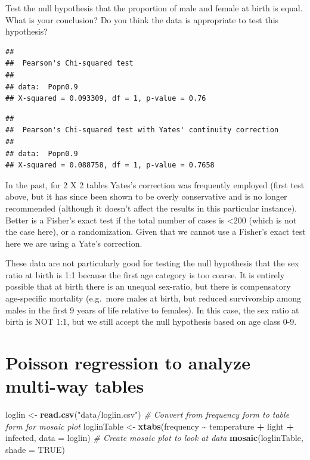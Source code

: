 \documentclass[
  12pt,
]{book}
\makeatletter
\newenvironment{Shaded}{\begin{snugshade}}{\end{snugshade}}
\newcommand{\CommentTok}[1]{\textcolor[rgb]{0.56,0.35,0.01}{\textit{#1}}}
\newcommand{\DataTypeTok}[1]{\textcolor[rgb]{0.13,0.29,0.53}{#1}}
\newcommand{\KeywordTok}[1]{\textcolor[rgb]{0.13,0.29,0.53}{\textbf{#1}}}
\newcommand{\NormalTok}[1]{#1}
\newcommand{\OperatorTok}[1]{\textcolor[rgb]{0.81,0.36,0.00}{\textbf{#1}}}
\newcommand{\OtherTok}[1]{\textcolor[rgb]{0.56,0.35,0.01}{#1}}
\newcommand{\StringTok}[1]{\textcolor[rgb]{0.31,0.60,0.02}{#1}}
\newenvironment{kframe}{%
\medskip{}
\setlength{\fboxsep}{.8em}
\def\at@end@of@kframe{}%
\ifinner\ifhmode%
 \def\at@end@of@kframe{\end{minipage}}%
 \begin{minipage}{\columnwidth}%
\fi\fi%
\def\FrameCommand##1{\hskip\@totalleftmargin \hskip-\fboxsep
\colorbox{incolor}{##1}\hskip-\fboxsep
    \hskip-\linewidth \hskip-\@totalleftmargin \hskip\columnwidth}%
\MakeFramed {\advance\hsize-\width
  \@totalleftmargin\z@ \linewidth\hsize
  \@setminipage}}%
{\par\unskip\endMakeFramed%
\at@end@of@kframe}
\newenvironment{rmdblock}[1]
 {
 \begin{itemize}
 \renewcommand{\labelitemi}{
   \raisebox{-.7\height}[0pt][0pt]{
     {\setkeys{Gin}{width=3em,keepaspectratio}\texttt{[image: images/\#1]}}
   }
 }
 \begin{kframe}
 \setlength{\fboxsep}{1em}
 \item
 }
 {
 \end{kframe}
 \end{itemize}
 }
\newenvironment{rmdcode}
  {\begin{rmdblock}{screen}}
  {\end{rmdblock}}
\makeatother
\begin{document}
\begin{rmdcode}
Test the null hypothesis that the proportion of male and female at birth is equal. What is your conclusion? Do you think the data is appropriate to test this hypothesis?
\end{rmdcode}

\begin{verbatim}
## 
##  Pearson's Chi-squared test
## 
## data:  Popn0.9
## X-squared = 0.093309, df = 1, p-value = 0.76
\end{verbatim}

\begin{verbatim}
## 
##  Pearson's Chi-squared test with Yates' continuity correction
## 
## data:  Popn0.9
## X-squared = 0.088758, df = 1, p-value = 0.7658
\end{verbatim}

In the past, for 2 X 2 tables Yates's correction was frequently employed (first test above, but it has since been shown to be overly conservative and is no longer recommended (although it doesn't affect the results in this particular instance). Better is a Fisher's exact test if the total number of cases is \textless200 (which is not the case here), or a randomization. Given that we cannot use a Fisher's exact test here we are using a Yate's correction.

These data are not particularly good for testing the null hypothesis that the sex ratio at birth is 1:1 because the first age category is too coarse. It is entirely possible that at birth there is an unequal sex-ratio, but there is compensatory age-specific mortality (e.g.~more males at birth, but reduced survivorship among males in the first 9 years of life relative to females). In this case, the sex ratio at birth is NOT 1:1, but we still accept the null hypothesis based on age class 0-9.

\hypertarget{poisson-regression-to-analyze-multi-way-tables}{%
\section{Poisson regression to analyze multi-way tables}\label{poisson-regression-to-analyze-multi-way-tables}}

\begin{Shaded}
\begin{Highlighting}[]
\NormalTok{loglin \textless{}{-}}\StringTok{ }\KeywordTok{read.csv}\NormalTok{(}\StringTok{"data/loglin.csv"}\NormalTok{)}
\CommentTok{\# Convert from frequency form to table form for mosaic plot}
\NormalTok{loglinTable \textless{}{-}}\StringTok{ }\KeywordTok{xtabs}\NormalTok{(frequency }\OperatorTok{\textasciitilde{}}\StringTok{ }\NormalTok{temperature }\OperatorTok{+}\StringTok{ }\NormalTok{light }\OperatorTok{+}\StringTok{ }\NormalTok{infected, }\DataTypeTok{data =}\NormalTok{ loglin)}
\CommentTok{\# Create mosaic plot to look at data}
\KeywordTok{mosaic}\NormalTok{(loglinTable, }\DataTypeTok{shade =} \OtherTok{TRUE}\NormalTok{)}
\end{Highlighting}
\end{Shaded}
\end{document}
